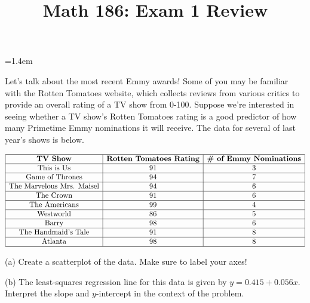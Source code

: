 \documentclass[12pt]{amsart}
\title{Math 186: Exam 1 Review}
\begin{document}
\maketitle



\begin{list}
{}
{\leftmargin=1.4em}


\item Let's talk about the most recent Emmy awards! Some of you may be familiar with the Rotten Tomatoes website, which collects reviews from various critics to provide an overall rating of a TV show from 0-100.  Suppose we're interested in seeing whether a TV show's Rotten Tomatoes rating is a good predictor of how many Primetime Emmy nominations it will receive.  The data for several of last year's shows is below.
\begin{center}
$\begin{array}{|c|c|c|}
\hline
\text{{\bf TV Show}}&\text{\bf{Rotten Tomatoes Rating}}&\text{\bf{\# of Emmy Nominations}}\\ 
\hline
\text{This is Us}& 91 & 3\\
\hline
\text{Game of Thrones}& 94 & 7\\
\hline
\text{The Marvelous Mrs. Maisel} & 94 & 6\\
\hline
\text{The Crown} & 91 & 6\\
\hline
\text{The Americans} & 99 & 4\\
\hline
\text{Westworld} & 86 & 5\\
\hline
\text{Barry} & 98 & 6\\
\hline
\text{The Handmaid's Tale} & 91 & 8\\
\hline
\text{Atlanta} & 98 & 8\\
\hline
\end{array}$
\end{center}

\subitem(a) Create a scatterplot of the data.  Make sure to label your axes!

\vspace{1in}

\subitem(b) The least-squares regression line for this data is given by $y=0.415+0.056x$.  Interpret the slope and $y$-intercept in the context of the problem.

\vspace{1in}


\end{list}
\end{document}
